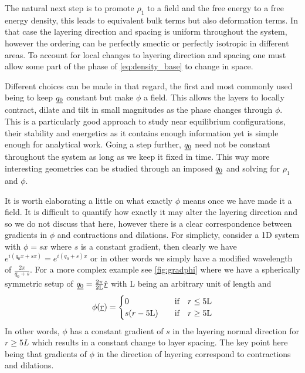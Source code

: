 \documentclass[12pt]{article}
\newcommand{\suf}[2]{\stackunder[0.5pt]{\stackunder[1pt]{\ensuremath{#1}}{\rule{\widthof{\ensuremath{#2}}*\real{0.9}}{.1ex}}}{}}
\newcommand{\su}[1]{\suf{#1}{#1}}
\begin{document}
The natural next step is to promote $\rho_1$ to a field and the free energy to a free energy density, this leads to equivalent bulk terms but also deformation terms.
In that case the layering direction and spacing is uniform throughout the system, however the ordering can be perfectly smectic or perfectly isotropic in different areas.
To account for local changes to layering direction and spacing one must allow some part of the phase of \cref{eq:density_base} to change in space.

Different choices can be made in that regard, the first and most commonly used being to keep $\su{q_0}$ constant but make $\phi$ a field.
This allows the layers to locally contract, dilate and tilt in small magnitudes as the phase changes through $\phi$.
This is a particularly good approach to study near equilibrium configurations, their stability and energetics as it contains enough information yet is simple enough for analytical work.
Going a step  further, $\su{q_0}$ need not be constant throughout the system as long as we keep it fixed in time.
This way more interesting geometries can be studied through an imposed $\su{q_0}$ and solving for $\rho_1$ and $\phi$.

It is worth elaborating a little on what exactly $\phi$ means once we have made it a field.
It is difficult to quantify how exactly it may alter the layering direction and so we do not discuss that here, however there is a clear correspondence between gradients in $\phi$ and contractions and dilations.
For simplicty, consider a 1D system with $\phi = s x$ where $s$ is a constant gradient, then clearly we have $e^{i(q_0 x + s x)} = e^{i(q_0 + s) x}$ or in other words we simply have a modified wavelength of $\frac{2\pi}{q_0 + s}$.
For a more complex example see \cref{fig:gradphi} where we have a spherically symmetric setup of $\su{q_0} = \frac{2\pi}{2\si{L}} \hat{\su{r}}$ with \si{L} being an arbitrary unit of length and
\begin{equation}\label{eq:gradphi_phi}
    \phi(\su{r}) = \begin{cases} 0 & \qq{if} r \leq 5\si{L} \\ s(r - 5\si{L}) & \qq{if} r \geq 5\si{L} \end{cases}
\end{equation}
In other words, $\phi$ has a constant gradient of $s$ in the layering normal direction for $r\geq5\si{L}$ which results in a constant change to layer spacing.
The key point here being that gradients of $\phi$ in the direction of layering correspond to contractions and dilations.
\end{document}

